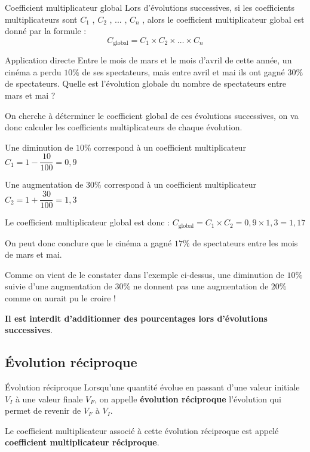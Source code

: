 \documentclass[oneside,12pt]{article}          %
\begin{document}
\begin{propriete}{Coefficient multiplicateur global}
	Lors d'évolutions successives, si les coefficients multiplicateurs sont $C_1$ , $C_2$ , ... , $C_n$ , alors le coefficient multiplicateur global est donné par la formule :
	\[ C_{\text{global}} = C_1 \times C_2 \times \ldots \times C_n \]
\end{propriete}

\begin{exemple}{Application directe}
	Entre le mois de mars et le mois d'avril de cette année, un cinéma a perdu $10\%$ de ses spectateurs, mais entre avril et mai ils ont gagné $30\%$ de spectateurs. Quelle est l'évolution globale du nombre de spectateurs entre mars et mai ?
	
	On cherche à déterminer le coefficient global de ces évolutions successives, on va donc calculer les coefficients multiplicateurs de chaque évolution.
	
	Une diminution de $10\%$ correspond à un coefficient multiplicateur $C_1 = 1 - \dfrac{10}{100} = 0,9$
	
	Une augmentation de $30\%$ correspond à un coefficient multiplicateur $C_2 = 1 + \dfrac{30}{100} = 1,3$
	
	Le coefficient multiplicateur global est donc : $C_{\text{global}} = C_1 \times C_2 = 0,9 \times 1,3 = 1,17$
	
	On peut donc conclure que le cinéma a gagné $17\%$ de spectateurs entre les mois de mars et mai.
\end{exemple}

\begin{remarque}
	Comme on vient de le constater dans l'exemple ci-dessus, une diminution de $10\%$ suivie d'une augmentation de $30\%$ ne donnent pas une augmentation de $20\%$ comme on aurait pu le croire !
	
	\textbf{Il est interdit d'additionner des pourcentages lors d'évolutions successives}.
\end{remarque}



\subsection{Évolution réciproque}

\begin{definition}{Évolution réciproque}
	Lorsqu'une quantité évolue en passant d'une valeur initiale $V_I$ à une valeur finale $V_F$, on appelle \textbf{évolution réciproque} l'évolution qui permet de revenir de $V_F$ à $V_I$.
	
	Le coefficient multiplicateur associé à cette évolution réciproque est appelé \textbf{coefficient multiplicateur réciproque}.
\end{definition}
\end{document}
